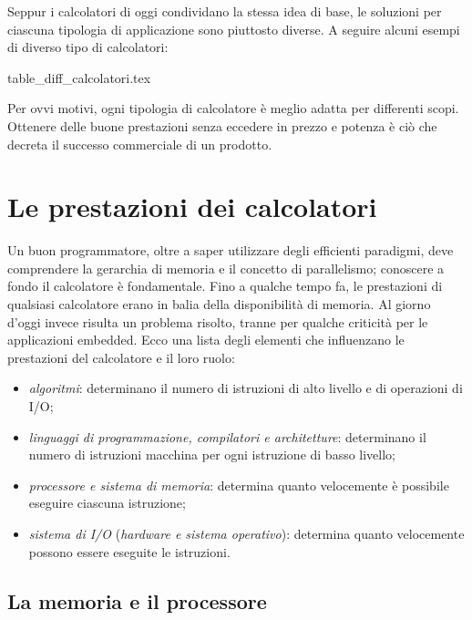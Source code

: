\documentclass[class=book, crop=false, oneside]{standalone}
\begin{document}
Seppur i calcolatori di oggi condividano la stessa idea di base, le soluzioni per ciascuna tipologia di applicazione sono piuttosto diverse.
A seguire alcuni esempi di diverso tipo di calcolatori:

\begin{table}[H]
	\centering
	{table_diff_calcolatori.tex}
\end{table}

Per ovvi motivi, ogni tipologia di calcolatore è meglio adatta per differenti scopi.
Ottenere delle buone prestazioni senza eccedere in prezzo e potenza è ciò che decreta il successo commerciale di un prodotto.

\section{Le prestazioni dei calcolatori}
Un buon programmatore, oltre a saper utilizzare degli efficienti paradigmi, deve comprendere la gerarchia di memoria e il concetto di parallelismo; conoscere a fondo il calcolatore è fondamentale.
Fino a qualche tempo fa, le prestazioni di qualsiasi calcolatore erano in balia della disponibilità di memoria.
Al giorno d'oggi invece risulta un problema risolto, tranne per qualche criticità per le applicazioni embedded.
Ecco una lista degli elementi che influenzano le prestazioni del calcolatore e il loro ruolo:
\begin{itemize}
	\item \emph{algoritmi}: determinano il numero di istruzioni di alto livello e di operazioni di I/O;
	\item \emph{linguaggi di programmazione, compilatori e architetture}: determinano il numero di istruzioni macchina per ogni istruzione di basso livello;
	\item \emph{processore e sistema di memoria}: determina quanto velocemente è possibile eseguire ciascuna istruzione;
	\item \emph{sistema di I/O} (\emph{hardware e sistema operativo}): determina quanto velocemente possono essere eseguite le istruzioni.
\end{itemize}

\subsection{La memoria e il processore}
\end{document}
